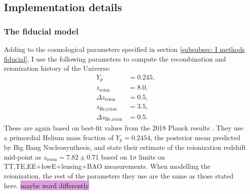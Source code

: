 \documentclass{aa}
\numberwithin{equation}{section}
\numberwithin{table}{section}
\numberwithin{figure}{section}
\begin{document}
\subsection{Implementation details}\label{subsec: II methods}

\subsubsection{The fiducial model}
Adding to the cosmological parameters specified in section \ref{subsubsec: I methods fiducial}, I use the following parameters to compute the recombination and reionization history of the Universe:
\begin{align*}
  Y_p &= 0.245,
  \\
  z_\text{reion} &= 8.0,
  \\
  \Delta z_\text{reion} &= 0.5,
  \\
  z_\text{He,reion} &= 3.5,
  \\
  \Delta z_\text{He,reion} &= 0.5.
\end{align*}
These are again based on best-fit values from the 2018 Planck results \citep[see][]{Planck}. They use a primordial Helium mass fraction of $Y_p=0.2454$, the posterior mean predicted by Big Bang Nucleosynthesis, and state their estimate of the reionization redshift mid-point as $z_\text{reion}=7.82\pm0.71$ based on $1\sigma$ limits on TT,TE,EE+lowE+lensing+BAO measurements. When modelling the reionization, the rest of the parameters they use are the same as those stated here. \colorbox{Plum}{maybe word differently}
\end{document}
